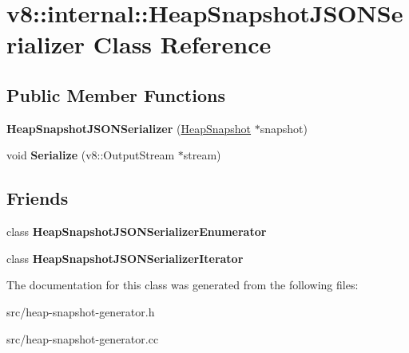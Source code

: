\hypertarget{classv8_1_1internal_1_1_heap_snapshot_j_s_o_n_serializer}{}\section{v8\+:\+:internal\+:\+:Heap\+Snapshot\+J\+S\+O\+N\+Serializer Class Reference}
\label{classv8_1_1internal_1_1_heap_snapshot_j_s_o_n_serializer}
\subsection*{Public Member Functions}
\begin{DoxyCompactItemize}
\item 
\hypertarget{classv8_1_1internal_1_1_heap_snapshot_j_s_o_n_serializer_acc182676e6b29f094c62ecec8bb3ff5b}{}{\bfseries Heap\+Snapshot\+J\+S\+O\+N\+Serializer} (\hyperlink{classv8_1_1internal_1_1_heap_snapshot}{Heap\+Snapshot} $\ast$snapshot)\label{classv8_1_1internal_1_1_heap_snapshot_j_s_o_n_serializer_acc182676e6b29f094c62ecec8bb3ff5b}

\item 
\hypertarget{classv8_1_1internal_1_1_heap_snapshot_j_s_o_n_serializer_a0cc8e8e97d0a2df0df0f59342ec447a2}{}void {\bfseries Serialize} (v8\+::\+Output\+Stream $\ast$stream)\label{classv8_1_1internal_1_1_heap_snapshot_j_s_o_n_serializer_a0cc8e8e97d0a2df0df0f59342ec447a2}

\end{DoxyCompactItemize}
\subsection*{Friends}
\begin{DoxyCompactItemize}
\item 
\hypertarget{classv8_1_1internal_1_1_heap_snapshot_j_s_o_n_serializer_aa8f0fed181b2cbcc6d42bb03ef455db5}{}class {\bfseries Heap\+Snapshot\+J\+S\+O\+N\+Serializer\+Enumerator}\label{classv8_1_1internal_1_1_heap_snapshot_j_s_o_n_serializer_aa8f0fed181b2cbcc6d42bb03ef455db5}

\item 
\hypertarget{classv8_1_1internal_1_1_heap_snapshot_j_s_o_n_serializer_a8044648e3cab653e8d53f7d5d11eaa80}{}class {\bfseries Heap\+Snapshot\+J\+S\+O\+N\+Serializer\+Iterator}\label{classv8_1_1internal_1_1_heap_snapshot_j_s_o_n_serializer_a8044648e3cab653e8d53f7d5d11eaa80}

\end{DoxyCompactItemize}


The documentation for this class was generated from the following files\+:\begin{DoxyCompactItemize}
\item 
src/heap-\/snapshot-\/generator.\+h\item 
src/heap-\/snapshot-\/generator.\+cc\end{DoxyCompactItemize}
